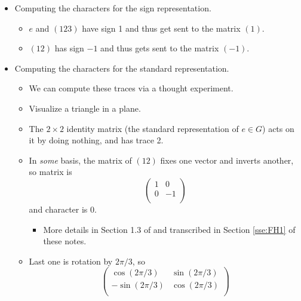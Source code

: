 \documentclass[../notes.tex]{subfiles}
\begin{document}
\begin{itemize}
\begin{enumerate}
\begin{itemize}
            \item Computing the characters for the sign representation.
            \begin{itemize}
                \item $e$ and $(123)$ have sign 1 and thus get sent to the matrix $(1)$.
                \item $(12)$ has sign $-1$ and thus gets sent to the matrix $(-1)$.
            \end{itemize}
            \item Computing the characters for the standard representation.
            \begin{itemize}
                \item We can compute these traces via a thought experiment.
                \item Visualize a triangle in a plane.
                \item The $2\times 2$ identity matrix (the standard representation of $e\in G$) acts on it by doing nothing, and has trace 2.
                \item In \emph{some} basis, the matrix of $(12)$ fixes one vector and inverts another, so matrix is
                \begin{equation*}
                    \begin{pmatrix}
                        1 & 0\\
                        0 & -1\\
                    \end{pmatrix}
                \end{equation*}
                and character is 0.
                \begin{itemize}
                    \item More details in Section 1.3 of \textcite{bib:FultonHarris} and transcribed in Section \ref{sse:FH1} of these notes.
                \end{itemize}
                \item Last one is rotation by $2\pi/3$, so
                \begin{equation*}
                    \begin{pmatrix}
                        \cos(2\pi/3) & \sin(2\pi/3)\\
                        -\sin(2\pi/3) & \cos(2\pi/3)\\
                    \end{pmatrix}
                \end{equation*}

\end{itemize}
\end{itemize}
\end{enumerate}
\end{itemize}
\end{document}
